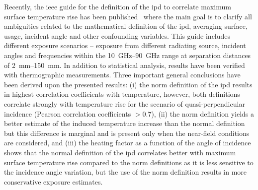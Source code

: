 Recently, the \gls{ieee} guide for the definition of the \gls{ipd} to correlate maximum surface temperature rise has been published~\cite{IEEE2021Guide} where the main goal is to clarify all ambiguities related to the mathematical definition of the \gls{ipd}, averaging surface, usage, incident angle and other confounding variables.
This guide includes different exposure scenarios -- exposure from different radiating source, incident angles and frequencies within the \SIrange[range-units=single,range-phrase=--]{10}{90}{\GHz} range at separation distances of \SIrange[range-units=single,range-phrase=--]{2}{150}{\mm}.
In addition to statistical analysis, results have been verified with thermographic measurements.
Three important general conclusions have been derived upon the presented results: (i) the norm definition of the \gls{ipd} results in highest correlation coefficients with temperature, however, both definitions correlate strongly with temperature rise for the scenario of quasi-perpendicular incidence (Pearson correlation coefficients $> 0.7$), (ii) the norm definition yields a better estimate of the induced temperature increase than the normal definition but this difference is marginal and is present only when the near-field conditions are considered, and (iii) the heating factor as a function of the angle of incidence shows that the normal definition of the \gls{ipd} correlates better with maximum surface temperature rise compared to the norm definitions as it is less sensitive to the incidence angle variation, but the use of the norm definition results in more conservative exposure estimates.


